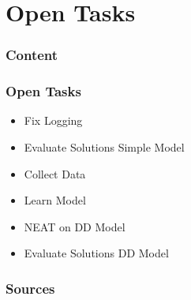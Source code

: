 \documentclass[8pt]{beamer}
\begin{document}
\section{Open Tasks}
\begin{frame}
	\frametitle{Content}
\end{frame}

\begin{frame}
	\frametitle{Open Tasks}
	\begin{block}{}
		\begin{itemize}
			\item Fix Logging
			\item Evaluate Solutions Simple Model
			\item Collect Data
			\item Learn Model
			\item NEAT on DD Model
			\item Evaluate Solutions DD Model
		\end{itemize}
	\end{block}
\end{frame}

\begin{frame}[allowframebreaks]
\frametitle{Sources}



\end{frame}
\end{document}
